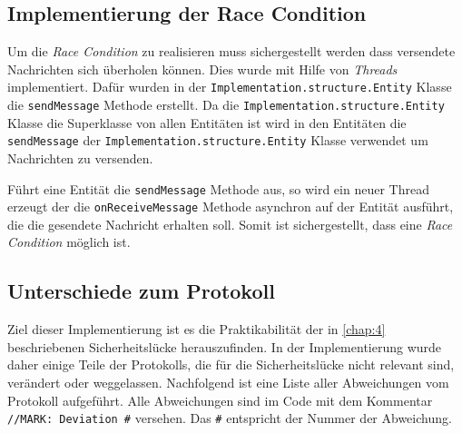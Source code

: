 \subsection{Implementierung der Race Condition}
Um die \textit{Race Condition} zu realisieren muss sichergestellt werden dass versendete Nachrichten sich überholen können.
Dies wurde mit Hilfe von \textit{Threads} implementiert.
Dafür wurden in der \lstinline{Implementation.structure.Entity} Klasse die \lstinline{sendMessage} Methode erstellt.
Da die \lstinline{Implementation.structure.Entity} Klasse die Superklasse von allen Entitäten ist wird in den Entitäten die \lstinline{sendMessage} der \lstinline{Implementation.structure.Entity} Klasse verwendet um Nachrichten zu versenden.

Führt eine Entität die \lstinline{sendMessage} Methode aus, so wird ein neuer Thread erzeugt der die \lstinline{onReceiveMessage} Methode asynchron auf der Entität ausführt, die die gesendete Nachricht erhalten soll.
Somit ist sichergestellt, dass eine \textit{Race Condition} möglich ist.


\subsection{Unterschiede zum Protokoll}
Ziel dieser Implementierung ist es die Praktikabilität der in \cref{chap:4} beschriebenen Sicherheitslücke herauszufinden.
In der Implementierung wurde daher einige Teile der Protokolls, die für die Sicherheitslücke nicht relevant sind, verändert oder weggelassen.
Nachfolgend ist eine Liste aller Abweichungen vom Protokoll aufgeführt.
Alle Abweichungen sind im Code mit dem Kommentar \lstinline{//MARK: Deviation #} versehen.
Das \lstinline{#} entspricht der Nummer der Abweichung.

